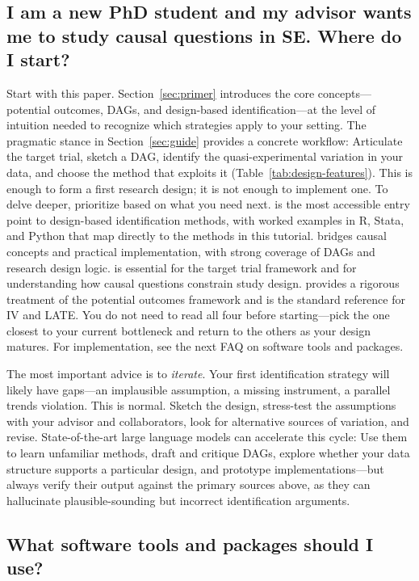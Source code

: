 \subsection{I am a new PhD student and my advisor wants me to study causal questions in SE. Where do I start?}

Start with this paper.
Section~\ref{sec:primer} introduces the core concepts---potential outcomes, DAGs, and design-based identification---at the level of intuition needed to recognize which strategies apply to your setting.
The pragmatic stance in Section~\ref{sec:guide} provides a concrete workflow: Articulate the target trial, sketch a DAG, identify the quasi-experimental variation in your data, and choose the method that exploits it (Table~\ref{tab:design-features}).
This is enough to form a first research design; it is not enough to implement one.
To delve deeper, prioritize based on what you need next.
\citet{cunningham2021causal} is the most accessible entry point to design-based identification methods, with worked examples in R, Stata, and Python that map directly to the methods in this tutorial.
\citet{huntingtonklein2021effect} bridges causal concepts and practical implementation, with strong coverage of DAGs and research design logic.
\citet{hernan2020causal} is essential for the target trial framework and for understanding how causal questions constrain study design.
\citet{angrist2009mostly} provides a rigorous treatment of the potential outcomes framework and is the standard reference for IV and LATE.
You do not need to read all four before starting---pick the one closest to your current bottleneck and return to the others as your design matures.
For implementation, see the next FAQ on software tools and packages.

The most important advice is to \emph{iterate}.
Your first identification strategy will likely have gaps---an implausible assumption, a missing instrument, a parallel trends violation.
This is normal.
Sketch the design, stress-test the assumptions with your advisor and collaborators, look for alternative sources of variation, and revise.
State-of-the-art large language models can accelerate this cycle: Use them to learn unfamiliar methods, draft and critique DAGs, explore whether your data structure supports a particular design, and prototype implementations---but always verify their output against the primary sources above, as they can hallucinate plausible-sounding but incorrect identification arguments.

\subsection{What software tools and packages should I use?}

